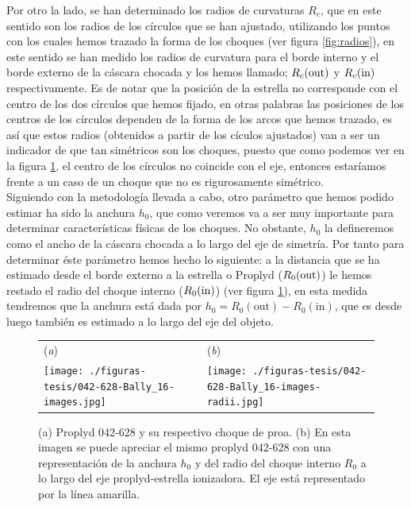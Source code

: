 Por otro la lado, se han determinado los radios de curvaturas \(R_{c}\), que en este sentido son los radios de los círculos que se han ajustado, utilizando los puntos con los cuales hemos trazado la forma de los choques (ver figura \ref{fig:radios}), en este sentido se han medido los radios de curvatura para el borde interno y el borde externo de la cáscara chocada y los hemos llamado; \(R_{c}(\mathrm{out}{})\) y \(R_{c}(\mathrm{in}{})\) respectivamente. Es de notar que la posición de la estrella no corresponde con el centro de los dos círculos que hemos fijado, en otras palabras las posiciones de los centros de los círculos dependen de la forma de los arcos que hemos trazado, es así que estos radios (obtenidos a partir de los cículos ajustados) van a ser un indicador de que tan simétricos son los choques, puesto que como podemos ver en la figura \ref{fig:anchura}, el centro de los círculos no coincide con el eje, entonces estaríamos frente a un caso de un choque que no es rigurosamente simétrico.\\

Siguiendo con la metodología llevada a cabo, otro parámetro que hemos podido estimar ha sido la anchura \(h_{0}\), que como veremos va a ser muy importante para determinar características físicas de los choques. No obstante, \(h_{0}\) la  defineremos como el ancho de la cáscara chocada a lo largo del eje de simetría. Por tanto para determinar éste parámetro hemos hecho lo siguiente: a la distancia que se ha estimado desde el borde externo a la estrella o Proplyd (\(R_{0}(\mathrm{out}{})\)) le hemos restado el radio del choque interno (\(R_{0}(\mathrm{in}{})\)) (ver figura \ref{fig:anchura}), en esta medida tendremos que la anchura está dada por \(h_{0} = R_{0}(\text{out}) - R_{0}(\text{in})\), que es desde luego también es estimado a lo largo del eje del objeto.

\begin{figure}[htp]
\centering
\begin{tabular}{l l}
(\textit{a}) & (\textit{b})  \\
  \texttt{[image: ./figuras-tesis/042-628-Bally\_16-images.jpg]}&
 \texttt{[image: ./figuras-tesis/042-628-Bally\_16-images-radii.jpg]}\\
\end{tabular}
\caption{(a) Proplyd 042-628 y su respectivo choque de proa. (b) En esta imagen se puede apreciar el mismo proplyd 042-628  con una representación de la anchura \(h_{0}\) y del radio del choque interno \(R_{0}\) a lo largo del eje proplyd-estrella ionizadora. El eje está representado por la línea amarilla.  }\label{fig:anchura}
\end{figure}



